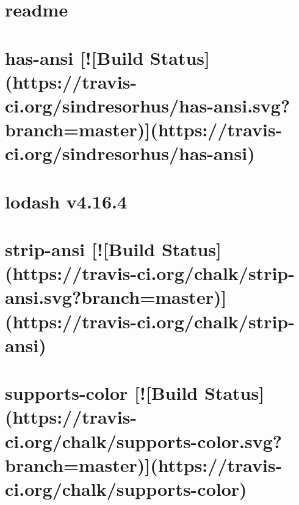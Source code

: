 \documentclass[twoside]{book}
\newcommand{\+}{\discretionary{\mbox{\scriptsize$\hookleftarrow$}}{}{}}
\begin{document}
\chapter{readme}
\label{md_app_web_node_modules_grunt-string-replace_node_modules_chalk_readme}

\chapter{has-\/ansi \mbox{[}!\mbox{[}Build Status\mbox{]}(https\+://travis-\/ci.org/sindresorhus/has-\/ansi.svg?branch=master)\mbox{]}(https\+://travis-\/ci.org/sindresorhus/has-\/ansi)}
\label{md_app_web_node_modules_grunt-string-replace_node_modules_has-ansi_readme}

\chapter{lodash v4.16.4}
\label{md_app_web_node_modules_grunt-string-replace_node_modules_lodash__r_e_a_d_m_e}

\chapter{strip-\/ansi \mbox{[}!\mbox{[}Build Status\mbox{]}(https\+://travis-\/ci.org/chalk/strip-\/ansi.svg?branch=master)\mbox{]}(https\+://travis-\/ci.org/chalk/strip-\/ansi)}
\label{md_app_web_node_modules_grunt-string-replace_node_modules_strip-ansi_readme}

\chapter{supports-\/color \mbox{[}!\mbox{[}Build Status\mbox{]}(https\+://travis-\/ci.org/chalk/supports-\/color.svg?branch=master)\mbox{]}(https\+://travis-\/ci.org/chalk/supports-\/color)}
\label{md_app_web_node_modules_grunt-string-replace_node_modules_supports-color_readme}

\end{document}
